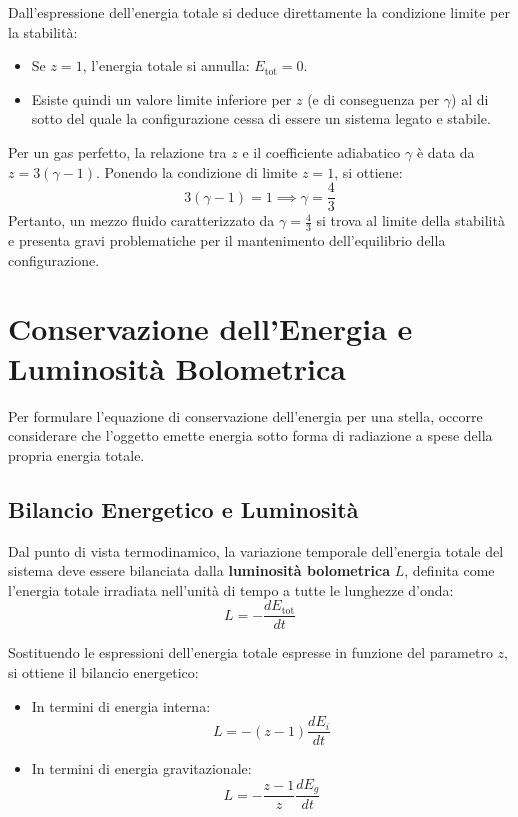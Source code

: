 Dall'espressione dell'energia totale si deduce direttamente la condizione limite per la stabilità:
\begin{itemize}
\item Se $z = 1$, l'energia totale si annulla: $E_{\text{tot}} = 0$.
\item Esiste quindi un valore limite inferiore per $z$ (e di conseguenza per $\gamma$) al di sotto del quale la configurazione cessa di essere un sistema legato e stabile.
\end{itemize}

Per un gas perfetto, la relazione tra $z$ e il coefficiente adiabatico $\gamma$ è data da $z = 3(\gamma - 1)$. Ponendo la condizione di limite $z = 1$, si ottiene:
\begin{equation}
3(\gamma - 1) = 1 \implies \gamma = \frac{4}{3}
\end{equation}
Pertanto, un mezzo fluido caratterizzato da $\gamma = \frac{4}{3}$ si trova al limite della stabilità e presenta gravi problematiche per il mantenimento dell'equilibrio della configurazione.

\section{Conservazione dell'Energia e Luminosità Bolometrica}

Per formulare l'equazione di conservazione dell'energia per una stella, occorre considerare che l'oggetto emette energia sotto forma di radiazione a spese della propria energia totale.

\subsection{Bilancio Energetico e Luminosità}
Dal punto di vista termodinamico, la variazione temporale dell'energia totale del sistema deve essere bilanciata dalla \textbf{luminosità bolometrica} $L$, definita come l'energia totale irradiata nell'unità di tempo a tutte le lunghezze d'onda:
\begin{equation}
L = -\frac{d E_{\text{tot}}}{dt}
\end{equation}

Sostituendo le espressioni dell'energia totale espresse in funzione del parametro $z$, si ottiene il bilancio energetico:
\begin{itemize}
\item In termini di energia interna:
\begin{equation}
L = -(z - 1) \frac{d E_i}{dt}
\end{equation}
\item In termini di energia gravitazionale:
\begin{equation}
L = -\frac{z - 1}{z} \frac{d E_g}{dt}
\end{equation}
\end{itemize}


